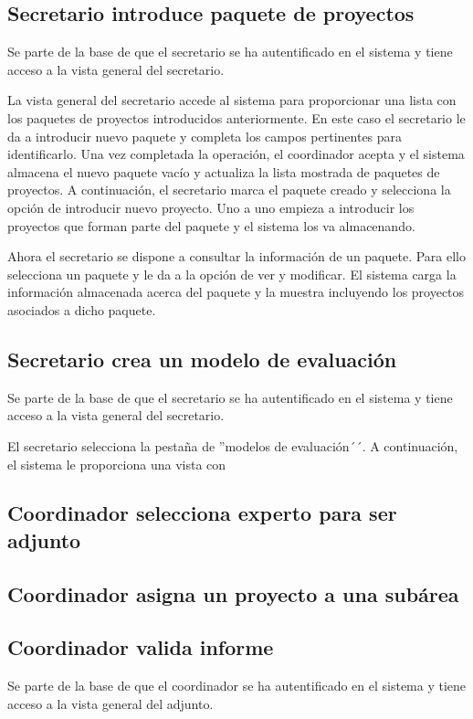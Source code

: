 \documentclass[11pt,a4paper,spanish,twoside]{book}
\begin{document}
\subsection{Secretario introduce paquete de proyectos}
Se parte de la base de que el secretario se ha autentificado en el sistema y
tiene acceso a la vista general del secretario.

La vista general del secretario accede al sistema para proporcionar una
lista con los paquetes de proyectos introducidos anteriormente. En este caso
el secretario le da a introducir nuevo paquete y completa los campos
pertinentes para identificarlo. Una vez completada la operación, el
coordinador acepta y el sistema almacena el nuevo paquete vacío y actualiza
la lista mostrada de paquetes de proyectos. A continuación, el secretario
marca el paquete creado y selecciona la opción de introducir nuevo proyecto.
Uno a uno empieza a introducir los proyectos que forman parte del paquete y
el sistema los va almacenando.

Ahora el secretario se dispone a consultar la información de un paquete.
Para ello selecciona un paquete y le da a la opción de ver y modificar. El
sistema carga la información almacenada acerca del paquete y la muestra
incluyendo los proyectos asociados a dicho paquete.

\subsection{Secretario crea un modelo de evaluación}
Se parte de la base de que el secretario se ha autentificado en el sistema y
tiene acceso a la vista general del secretario.

El secretario selecciona la pestaña de ''modelos de evaluación´´. A
continuación, el sistema le proporciona una vista con
\subsection{Coordinador selecciona experto para ser adjunto}

\subsection{Coordinador asigna un proyecto a una subárea}

\subsection{Coordinador valida informe}
Se parte de la base de que el coordinador se ha autentificado en el sistema y
tiene acceso a la vista general del adjunto.
\end{document}
